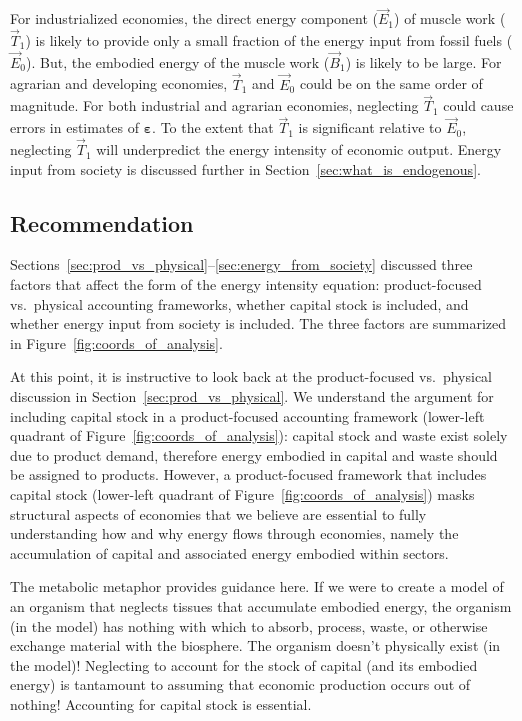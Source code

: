 For industrialized economies, the direct energy component ($\vec{E}_{1}$) 
of muscle work ($\vec{T}_{1}$)
is likely to provide only a small fraction
of the energy input from fossil fuels ($\vec{E}_{0}$).
But, the embodied energy of the muscle work ($\vec{B}_{1}$) is likely to be large.
For agrarian 
and developing economies, 
$\vec{T}_{1}$ and $\vec{E}_{0}$ 
could be on the same order of magnitude.
For both industrial and agrarian economies,
neglecting $\vec{T}_{1}$ could cause errors
in estimates of $\boldsymbol{\varepsilon}$.
To the extent that $\vec{T}_{1}$ 
is significant relative to $\vec{E}_{0}$,
neglecting $\vec{T}_{1}$
will underpredict the energy intensity of economic output.
Energy input from society is discussed further 
in Section~\ref{sec:what_is_endogenous}.


\subsection{Recommendation}
\label{sec:I-O_recommendation}

Sections~\ref{sec:prod_vs_physical}--\ref{sec:energy_from_society} 
discussed three factors that affect the form of the
energy intensity equation: 
product-focused vs.\ physical accounting frameworks,
whether capital stock is included, and
whether energy input from society is included.
The three factors are summarized in Figure~\ref{fig:coords_of_analysis}.

At this point, it is instructive to look back at the 
product-focused vs.\ physical discussion in Section~\ref{sec:prod_vs_physical}.
We understand the argument for including capital stock in a product-focused
accounting framework (lower-left quadrant of Figure~\ref{fig:coords_of_analysis}):
capital stock and waste exist 
solely due to product demand, 
therefore energy embodied in capital and waste should be assigned to products. 
However, a product-focused framework that includes capital stock (lower-left quadrant of
Figure~\ref{fig:coords_of_analysis})
masks structural aspects of economies
that we believe are essential to fully understanding how and why energy flows 
through economies, namely the accumulation of capital
and associated energy embodied within sectors.

The metabolic metaphor provides guidance here. 
If we were to create a model of an organism that neglects 
tissues that accumulate embodied energy,
the organism (in the model) has nothing with which to 
absorb, process, waste, or otherwise exchange
material with the biosphere.
The organism doesn't physically exist (in the model)!
Neglecting to account for the stock of capital (and its embodied energy) 
is tantamount to assuming that economic production occurs out of nothing!
Accounting for capital stock is essential.

